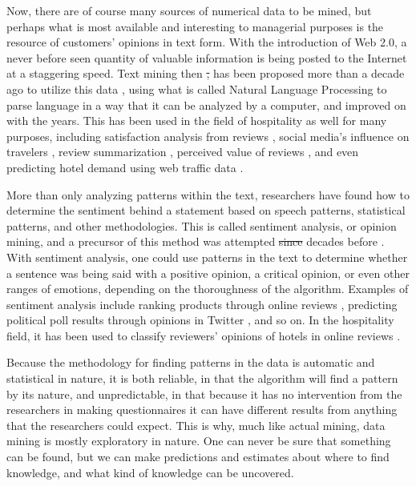 \documentclass[review]{elsarticle}
\providecommand{\DIFadd}[1]{{\protect\color{blue}\uwave{#1}}} %
\providecommand{\DIFdel}[1]{{\protect\color{red}\sout{#1}}}                      %
\providecommand{\DIFaddbegin}{} %
\providecommand{\DIFaddend}{} %
\providecommand{\DIFdelbegin}{} %
\providecommand{\DIFdelend}{} %
\newcommand{\DIFscaledelfig}{0.5}
\newlength{\DIFdelgraphicswidth} %
\newlength{\DIFdelgraphicsheight} %
\newcommand{\DIFaddincludegraphics}[2][]{{\color{blue}\fbox{\DIFOincludegraphics[#1]{#2}}}} %
\newcommand{\DIFdelincludegraphics}[2][]{%
\sbox{\DIFdelgraphicsbox}{\DIFOincludegraphics[#1]{#2}}%
\settoboxwidth{\DIFdelgraphicswidth}{\DIFdelgraphicsbox} %
\settoboxtotalheight{\DIFdelgraphicsheight}{\DIFdelgraphicsbox} %
\scalebox{\DIFscaledelfig}{%
\parbox[b]{\DIFdelgraphicswidth}{\usebox{\DIFdelgraphicsbox}\\[-\baselineskip] \rule{\DIFdelgraphicswidth}{0em}}\llap{\resizebox{\DIFdelgraphicswidth}{\DIFdelgraphicsheight}{%
\setlength{\unitlength}{\DIFdelgraphicswidth}%
\begin{picture}(1,1)%
\thicklines\linethickness{2pt} %
{\color[rgb]{1,0,0}\put(0,0){\framebox(1,1){}}}%
{\color[rgb]{1,0,0}\put(0,0){\line( 1,1){1}}}%
{\color[rgb]{1,0,0}\put(0,1){\line(1,-1){1}}}%
\end{picture}%
}\hspace*{3pt}}} %
} %
\DeclareRobustCommand{\DIFaddbegin}{\DIFOaddbegin \let\includegraphics\DIFaddincludegraphics} %
\DeclareRobustCommand{\DIFaddend}{\DIFOaddend \let\includegraphics\DIFOincludegraphics} %
\DeclareRobustCommand{\DIFdelbegin}{\DIFOdelbegin \let\includegraphics\DIFdelincludegraphics} %
\DeclareRobustCommand{\DIFdelend}{\DIFOaddend \let\includegraphics\DIFOincludegraphics} %
\begin{document}
Now, there are of course many sources of numerical data to be mined, but perhaps what is most available and interesting to managerial purposes is the resource of customers' opinions in text form. With the introduction of Web 2.0, a never before seen quantity of valuable information is being posted to the Internet at a staggering speed. Text mining then \DIFdelbegin \DIFdel{, }\DIFdelend has been proposed more than a decade ago to utilize this data \cite[e.g.][]{rajman1998text,nahm2002text}, using what is called Natural Language Processing to parse language in a way that it can be analyzed by a computer, and improved on with the years. This has been used in the field of hospitality as well for many purposes, including satisfaction analysis from reviews \cite[e.g][]{berezina2016, xu2016, xiang2015, hargreaves2015, balbi2018}, social media's influence on travelers \cite[e.g.][]{xiang2010}, review summarization \cite[e.g.][]{hu2017436}, perceived value of reviews \cite[e.g][]{FANG2016498}, and even predicting hotel demand using web traffic data \cite[e.g][]{yang2014}.

More than only analyzing patterns within the text, researchers have found how to determine the sentiment behind a statement based on speech patterns, statistical patterns, and other methodologies. This is called sentiment analysis, or opinion mining, and a precursor of this method was attempted \DIFdelbegin \DIFdel{since }\DIFdelend \DIFaddbegin \DIFadd{for }\DIFaddend decades before \cite[][]{stone1966general}. With sentiment analysis, one could use patterns in the text to determine whether a sentence was being said with a positive opinion, a critical opinion, or even other ranges of emotions, depending on the thoroughness of the algorithm. Examples of sentiment analysis include ranking products through online reviews \cite[e.g][]{liu2017149, zhang2011}, predicting political poll results through opinions in Twitter \cite[][]{oconnor2010}, and so on. In the hospitality field, it has been used to classify reviewers' opinions of hotels in online reviews \cite[e.g.]{kim2017362, alsmadi2018}. 

Because the methodology for finding patterns in the data is automatic and statistical in nature, it is both reliable, in that the algorithm will find a pattern by its nature, and unpredictable, in that because it has no intervention from the researchers in making questionnaires it can have different results from anything that the researchers could expect. This is why, much like actual mining, data mining is mostly exploratory in nature. One can never be sure that something can be found, but we can make predictions and estimates about where to find knowledge, and what kind of knowledge can be uncovered. 
\end{document}
